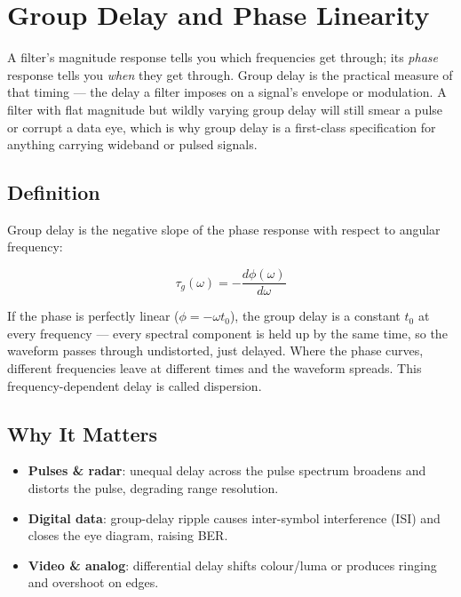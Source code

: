 \section{Group Delay and Phase Linearity}\label{sec:wiki_group_delay}



A filter's magnitude response tells you which frequencies get through; its \emph{phase} response tells you \emph{when} they get through. Group delay is the practical measure of that timing — the delay a filter imposes on a signal's envelope or modulation. A filter with flat magnitude but wildly varying group delay will still smear a pulse or corrupt a data eye, which is why group delay is a first-class specification for anything carrying wideband or pulsed signals.

      

\subsection{Definition}

      

Group delay is the negative slope of the phase response with respect to angular frequency:

      
\[\tau_g(\omega) = -\dfrac{d\phi(\omega)}{d\omega}\]

      

If the phase is perfectly linear ($\phi=-\omega t_0$), the group delay is a constant $t_0$ at every frequency — every spectral component is held up by the same time, so the waveform passes through undistorted, just delayed. Where the phase curves, different frequencies leave at different times and the waveform spreads. This frequency-dependent delay is called dispersion.


      

\subsection{Why It Matters}

      
\begin{itemize}

        \item \textbf{Pulses \& radar}: unequal delay across the pulse spectrum broadens and distorts the pulse, degrading range resolution.

        \item \textbf{Digital data}: group-delay ripple causes inter-symbol interference (ISI) and closes the eye diagram, raising BER.

        \item \textbf{Video \& analog}: differential delay shifts colour/luma or produces ringing and overshoot on edges.

      
\end{itemize}

